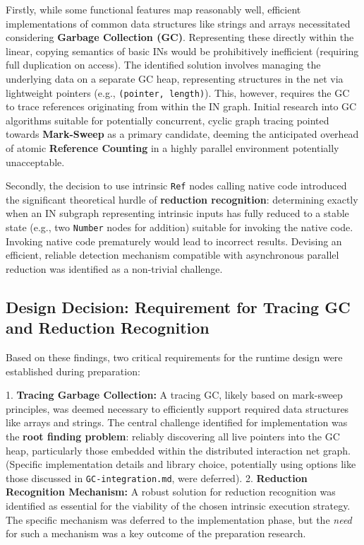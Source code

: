 Firstly, while some functional features map reasonably well, efficient implementations of common data structures like strings and arrays necessitated considering \textbf{Garbage Collection (GC)}. Representing these directly within the linear, copying semantics of basic INs would be prohibitively inefficient (requiring full duplication on access). The identified solution involves managing the underlying data on a separate GC heap, representing structures in the net via lightweight pointers (e.g., \texttt{(pointer, length)}). This, however, requires the GC to trace references originating from within the IN graph. Initial research into GC algorithms suitable for potentially concurrent, cyclic graph tracing pointed towards \textbf{Mark-Sweep} as a primary candidate, deeming the anticipated overhead of atomic \textbf{Reference Counting} in a highly parallel environment potentially unacceptable.

Secondly, the decision to use intrinsic \texttt{Ref} nodes calling native code introduced the significant theoretical hurdle of \textbf{reduction recognition}: determining exactly when an IN subgraph representing intrinsic inputs has fully reduced to a stable state (e.g., two \texttt{Number} nodes for addition) suitable for invoking the native code. Invoking native code prematurely would lead to incorrect results. Devising an efficient, reliable detection mechanism compatible with asynchronous parallel reduction was identified as a non-trivial challenge.

\subsection{Design Decision: Requirement for Tracing GC and Reduction Recognition}
Based on these findings, two critical requirements for the runtime design were established during preparation:

1.  \textbf{Tracing Garbage Collection:} A tracing GC, likely based on mark-sweep principles, was deemed necessary to efficiently support required data structures like arrays and strings. The central challenge identified for implementation was the \textbf{root finding problem}: reliably discovering all live pointers into the GC heap, particularly those embedded within the distributed interaction net graph. (Specific implementation details and library choice, potentially using options like those discussed in \texttt{GC-integration.md}, were deferred).
2.  \textbf{Reduction Recognition Mechanism:} A robust solution for reduction recognition was identified as essential for the viability of the chosen intrinsic execution strategy. The specific mechanism was deferred to the implementation phase, but the \textit{need} for such a mechanism was a key outcome of the preparation research.


